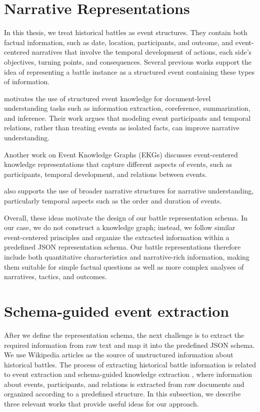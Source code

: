 \section{Narrative Representations}
In this thesis, we treat historical battles as event structures. They contain both factual information, such as date, location, participants, and outcome, and event-centered narratives that involve the temporal development of actions, each side’s objectives, turning points, and consequences. Several previous works support the idea of representing a battle instance as a structured event containing these types of information. 

\citet{chambers2010narrativeschemas} motivates the use of structured event knowledge for document-level understanding tasks such as information extraction, coreference, summarization, and inference. Their work argues that modeling event participants and temporal relations, rather than treating events as isolated facts, can improve narrative understanding. 

Another work on Event Knowledge Graphs (EKGs) \citep{guan2023eventkg} discusses event-centered knowledge representations that capture different aspects of events, such as participants, temporal development, and relations between events. 

\citet{hamilton2026narrabench} also supports the use of broader narrative structures for narrative understanding, particularly temporal aspects such as the order and duration of events.

Overall, these ideas motivate the design of our battle representation schema. In our case, we do not construct a knowledge graph; instead, we follow similar event-centered principles and organize the extracted information within a predefined JSON representation schema. Our battle representations therefore include both quantitative characteristics and narrative-rich information, making them suitable for simple factual questions as well as more complex analyses of narratives, tactics, and outcomes.
\section{Schema-guided event extraction}
After we define the representation schema, the next challenge is to extract the required information from raw text and map it into the predefined JSON schema. We use Wikipedia articles as the source of unstructured information about historical battles. The process of extracting historical battle information is related to event extraction \citep{lai2022eventextraction} and schema-guided knowledge extraction \citep{luo2025oneke}, where information about events, participants, and relations is extracted from raw documents and organized according to a predefined structure. In this subsection, we describe three relevant works that provide useful ideas for our approach.

